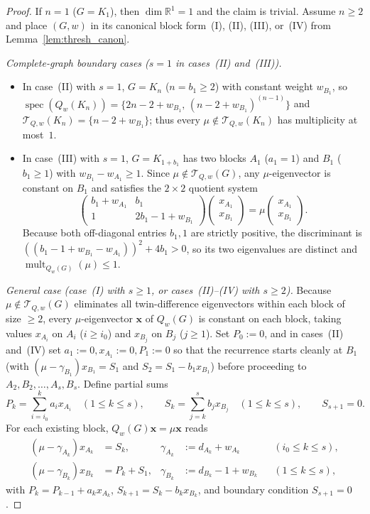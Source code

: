 \documentclass[11pt,a4paper]{article}
\theoremstyle{definition}
\DeclareMathOperator{\mult}{mult}
\DeclareMathOperator{\spec}{spec}
\begin{document}
\begin{proof}
  If $n = 1$ ($G = K_1$), then $\dim \mathbb{R}^1 = 1$ and the claim is trivial. Assume $n \ge 2$ and place $(G, w)$ in its canonical block form~(I), (II), (III), or~(IV) from Lemma~\ref{lem:thresh_canon}.

  \emph{Complete-graph boundary cases ($s = 1$ in cases~(II) and~(III)).}
  \begin{itemize}
    \item In case~(II) with $s = 1$, $G = K_n$ ($n = b_1 \ge 2$) with constant weight $w_{B_1}$, so $\spec(Q_w(K_n)) = \{2n-2+w_{B_1},\, (n-2+w_{B_1})^{(n-1)}\}$ and $\mathcal{T}_{Q,w}(K_n) = \{n-2+w_{B_1}\}$; thus every $\mu \notin \mathcal{T}_{Q,w}(K_n)$ has multiplicity at most~$1$.
    \item In case~(III) with $s = 1$, $G = K_{1+b_1}$ has two blocks $A_1$ ($a_1 = 1$) and $B_1$ ($b_1 \ge 1$) with $w_{B_1} - w_{A_1} \ge 1$. Since $\mu \notin \mathcal{T}_{Q,w}(G)$, any $\mu$-eigenvector is constant on $B_1$ and satisfies the $2 \times 2$ quotient system
    \[
      \begin{pmatrix} b_1 + w_{A_1} & b_1 \\ 1 & 2b_1 - 1 + w_{B_1} \end{pmatrix}
      \begin{pmatrix} x_{A_1} \\ x_{B_1} \end{pmatrix} = \mu \begin{pmatrix} x_{A_1} \\ x_{B_1} \end{pmatrix}.
    \]
    Because both off-diagonal entries $b_1, 1$ are strictly positive, the discriminant is $((b_1 - 1 + w_{B_1} - w_{A_1}))^2 + 4b_1 > 0$, so its two eigenvalues are distinct and $\mult_{Q_w(G)}(\mu) \le 1$.
  \end{itemize}

  \emph{General case (case~(I) with $s \ge 1$, or cases~(II)--(IV) with $s \ge 2$).} Because $\mu \notin \mathcal{T}_{Q,w}(G)$ eliminates all twin-difference eigenvectors within each block of size $\ge 2$, every $\mu$-eigenvector $\mathbf{x}$ of $Q_w(G)$ is constant on each block, taking values $x_{A_i}$ on $A_i$ ($i \ge i_0$) and $x_{B_j}$ on $B_j$ ($j \ge 1$). Set $P_0 := 0$, and in cases~(II) and~(IV) set $a_1 := 0, x_{A_1} := 0, P_1 := 0$ so that the recurrence starts cleanly at $B_1$ (with $(\mu - \gamma_{B_1}) x_{B_1} = S_1$ and $S_2 = S_1 - b_1 x_{B_1}$) before proceeding to $A_2, B_2, \dots, A_s, B_s$. Define partial sums
  \[
    P_k = \sum_{i=i_0}^{k} a_i x_{A_i} \quad (1 \le k \le s), \qquad
    S_k = \sum_{j=k}^{s} b_j x_{B_j} \quad (1 \le k \le s), \qquad S_{s+1} = 0.
  \]
  For each existing block, $Q_w(G)\mathbf{x} = \mu \mathbf{x}$ reads
  \begin{align}
    (\mu - \gamma_{A_k}) x_{A_k} &= S_k, & \gamma_{A_k} &:= d_{A_k} + w_{A_k} && (i_0 \le k \le s), \label{eq:thresh_A}\\
    (\mu - \gamma_{B_k}) x_{B_k} &= P_k + S_1, & \gamma_{B_k} &:= d_{B_k} - 1 + w_{B_k} && (1 \le k \le s), \label{eq:thresh_B}
  \end{align}
  with $P_k = P_{k-1} + a_k x_{A_k}$, $S_{k+1} = S_k - b_k x_{B_k}$, and boundary condition $S_{s+1} = 0$.


\end{proof}
\end{document}
